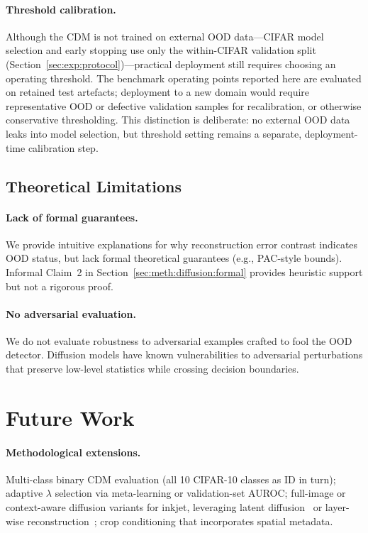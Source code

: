 \paragraph{Threshold calibration.}
Although the CDM is not trained on external OOD data---CIFAR model
selection and early stopping use only the within-CIFAR validation split
(Section~\ref{sec:exp:protocol})---practical deployment still requires
choosing an operating threshold. The benchmark operating points reported
here are evaluated on retained test artefacts; deployment to a new domain
would require representative OOD or defective validation samples for
recalibration, or otherwise conservative thresholding. This distinction
is deliberate: no external OOD data leaks into model selection, but
threshold setting remains a separate, deployment-time calibration step.

\subsection{Theoretical Limitations}
\label{sec:disc:limitations:theoretical}

\paragraph{Lack of formal guarantees.}
We provide intuitive explanations for why reconstruction error contrast
indicates OOD status, but lack formal theoretical guarantees (e.g.,
PAC-style bounds). Informal Claim~2 in
Section~\ref{sec:meth:diffusion:formal}
provides heuristic support but not a rigorous proof.

\paragraph{No adversarial evaluation.}
We do not evaluate robustness to adversarial examples crafted to fool the
OOD detector. Diffusion models have known vulnerabilities to adversarial
perturbations that preserve low-level statistics while crossing decision
boundaries.

\section{Future Work}
\label{sec:disc:future}

\paragraph{Methodological extensions.}
Multi-class binary CDM evaluation (all 10 CIFAR-10 classes as ID in
turn); adaptive $\lambda$ selection via meta-learning or validation-set
AUROC; full-image or context-aware diffusion variants for inkjet,
leveraging latent diffusion~\cite{linmans2024diffusion} or layer-wise
reconstruction~\cite{yang2024diffusion}; crop conditioning that
incorporates spatial metadata.


